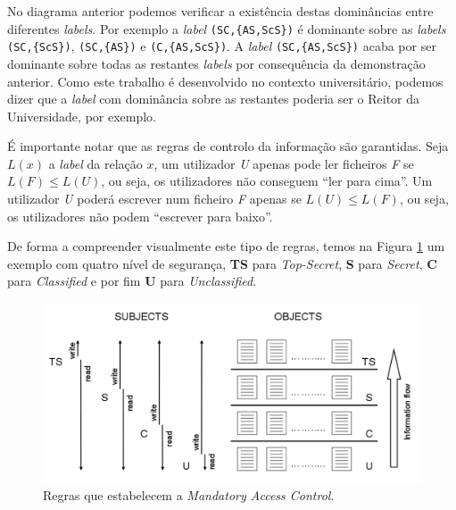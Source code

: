 \documentclass[../tp2.tex]{subfiles}
\begin{document}
No diagrama anterior podemos verificar a existência destas dominâncias entre diferentes \textit{labels}. Por exemplo a \textit{label} \texttt{(SC,\{AS,ScS\})} é dominante sobre as \textit{labels} \texttt{(SC,\{ScS\})}, \texttt{(SC,\{AS\})} e \texttt{(C,\{AS,ScS\})}. A \textit{label} \texttt{(SC,\{AS,ScS\})} acaba por ser dominante sobre todas as restantes \textit{labels} por consequência da demonstração anterior. Como este trabalho é desenvolvido no contexto universitário, podemos dizer que a \textit{label} com dominância sobre as restantes poderia ser o Reitor da Universidade, por exemplo.\par 
É importante notar que as regras de controlo da informação são garantidas. Seja $L(x)$ a \textit{label} da relação $x$, um utilizador \textit{U} apenas pode ler ficheiros \textit{F} se $L(F) \leq L(U)$, ou seja, os utilizadores não conseguem ``ler para cima''. Um utilizador \textit{U} poderá escrever num ficheiro \textit{F} apenas se $L(U) \leq L(F)$, ou seja, os utilizadores não podem ``escrever para baixo''.\par 
De forma a compreender visualmente este tipo de regras, temos na Figura \ref{fig:regras} um exemplo com quatro nível de segurança, \textbf{TS} para \textit{Top-Secret}, \textbf{S} para \textit{Secret}, \textbf{C} para \textit{Classified} e por fim \textbf{U} para \textit{Unclassified}.

\begin{figure}[H]\centering \captionsetup{justification=centering,margin=2cm} \centerline{\includegraphics[scale=0.4]{../imagens/regras.png}} \caption{Regras que estabelecem a \textit{Mandatory Access Control}.} \label{fig:regras}

\end{figure}
\end{document}
